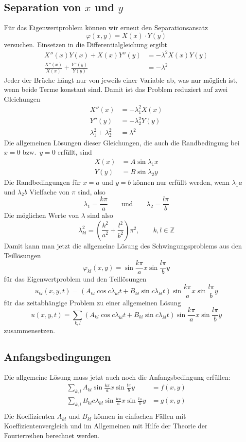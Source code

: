 \subsection{Separation von $x$ und $y$}
Für das Eigenwertproblem können wir erneut den Separationsansatz
\[
\varphi(x,y)=X(x)\cdot Y(y)
\]
versuchen.
Einsetzen in die Differentialgleichung ergibt
\begin{align*}
X''(x)Y(x)+X(x)Y''(y)&=-\lambda^2 X(x)Y(y)
\\
\frac{X''(x)}{X(x)}+\frac{Y''(y)}{Y(y)}&=-\lambda^2
\end{align*}
Jeder der Brüche hängt nur von jeweils einer Variable ab, was nur
möglich ist, wenn beide Terme konstant sind. Damit ist das Problem
reduziert auf zwei Gleichungen
\begin{align*}
X''(x)&=-\lambda_1^2X(x)\\
Y''(y)&=-\lambda_2^2Y(y)\\
\lambda_1^2+\lambda_2^2&=\lambda^2
\end{align*}
Die allgemeinen Lösungen dieser Gleichungen, die auch die Randbedingung
bei $x=0$ bzw.~$y=0$ erfüllt, sind
\begin{align*}
X(x)&=A\sin \lambda_1x\\
Y(y)&=B\sin \lambda_2y
\end{align*}
Die Randbedingungen für $x=a$ und $y=b$ können nur erfüllt werden,
wenn $\lambda_1a$ und $\lambda_2b$ Vielfache von $\pi$ sind, also
\[
\lambda_1=\frac{k\pi}a
\qquad
\text{und}
\qquad
\lambda_2=\frac{l\pi}b
\]
Die möglichen Werte von $\lambda$ sind also
\[
\lambda_{kl}^2=\left(\frac{k^2}{a^2} + \frac{l^2}{b^2}\right)\pi^2,\qquad k,l\in\mathbb Z
\]
Damit kann man jetzt die allgemeine Lösung des Schwingungsproblems aus den
Teillösungen
\[
\varphi_{kl}(x,y)=\sin \frac{k\pi}{a}x\sin\frac{l\pi}{b}y
\]
für das Eigenwertproblem
und den Teillösungen
\[
u_{kl}(x,y,t)
=
(A_{kl}\cos c\lambda_{kl} t+
B_{kl}\sin c\lambda_{kl} t)
\sin \frac{k\pi}{a}x\sin\frac{l\pi}{b}y
\]
für das zeitabhängige Problem
zu einer allgemeinen Lösung
\begin{equation}
u(x,y,t)=\sum_{k,l}
(A_{kl}\cos c\lambda_{kl} t+
B_{kl}\sin c\lambda_{kl} t)
\sin \frac{k\pi}{a}x\sin\frac{l\pi}{b}y
\label{allgemeineloesung}
\end{equation}
zusammensetzen.

\subsection{Anfangsbedingungen}
Die allgemeine Lösung muss jetzt auch noch die Anfangsbedingung erfüllen:
\begin{align*}
\sum_{k,l}A_{kl}
\sin \frac{k\pi}{a}x\sin\frac{l\pi}{b}y&=f(x,y)\\
\sum_{k,l}B_{kl}c\lambda_{kl}
\sin \frac{k\pi}{a}x\sin\frac{l\pi}{b}y&=g(x,y)\\
\end{align*}
Die Koeffizienten $A_{kl}$ und $B_{kl}$ können in einfachen Fällen mit
Koeffizientenvergleich und im Allgemeinen mit Hilfe der Theorie
der Fourierreihen berechnet werden.

